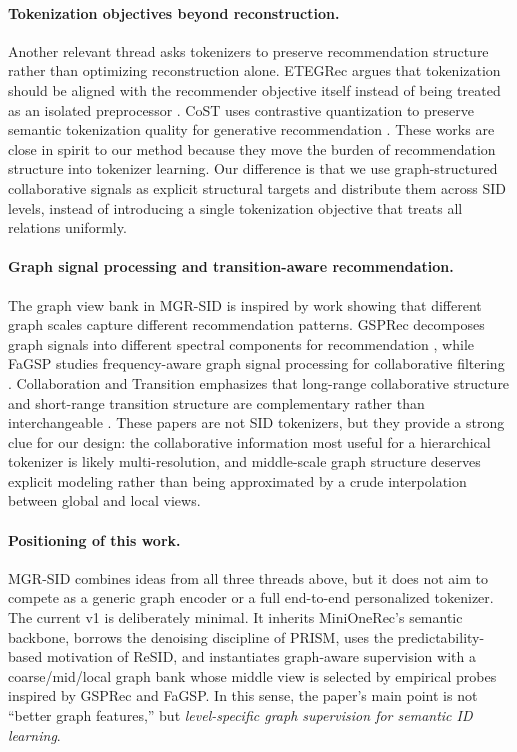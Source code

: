 \paragraph{Tokenization objectives beyond reconstruction.}
Another relevant thread asks tokenizers to preserve recommendation structure rather than optimizing reconstruction alone. ETEGRec argues that tokenization should be aligned with the recommender objective itself instead of being treated as an isolated preprocessor \citep{liu2024etegrec}. CoST uses contrastive quantization to preserve semantic tokenization quality for generative recommendation \citep{zhu2024cost}. These works are close in spirit to our method because they move the burden of recommendation structure into tokenizer learning. Our difference is that we use graph-structured collaborative signals as explicit structural targets and distribute them across SID levels, instead of introducing a single tokenization objective that treats all relations uniformly.

\paragraph{Graph signal processing and transition-aware recommendation.}
The graph view bank in MGR-SID is inspired by work showing that different graph scales capture different recommendation patterns. GSPRec decomposes graph signals into different spectral components for recommendation \citep{rabiah2025gsprec}, while FaGSP studies frequency-aware graph signal processing for collaborative filtering \citep{xia2024fagsp}. Collaboration and Transition emphasizes that long-range collaborative structure and short-range transition structure are complementary rather than interchangeable \citep{zhu2023collaborationtransition}. These papers are not SID tokenizers, but they provide a strong clue for our design: the collaborative information most useful for a hierarchical tokenizer is likely multi-resolution, and middle-scale graph structure deserves explicit modeling rather than being approximated by a crude interpolation between global and local views.

\paragraph{Positioning of this work.}
MGR-SID combines ideas from all three threads above, but it does not aim to compete as a generic graph encoder or a full end-to-end personalized tokenizer. The current v1 is deliberately minimal. It inherits MiniOneRec's semantic \rqvae{} backbone, borrows the denoising discipline of PRISM, uses the predictability-based motivation of ReSID, and instantiates graph-aware supervision with a coarse/mid/local graph bank whose middle view is selected by empirical probes inspired by GSPRec and FaGSP. In this sense, the paper's main point is not ``better graph features,'' but \emph{level-specific graph supervision for semantic ID learning}.
